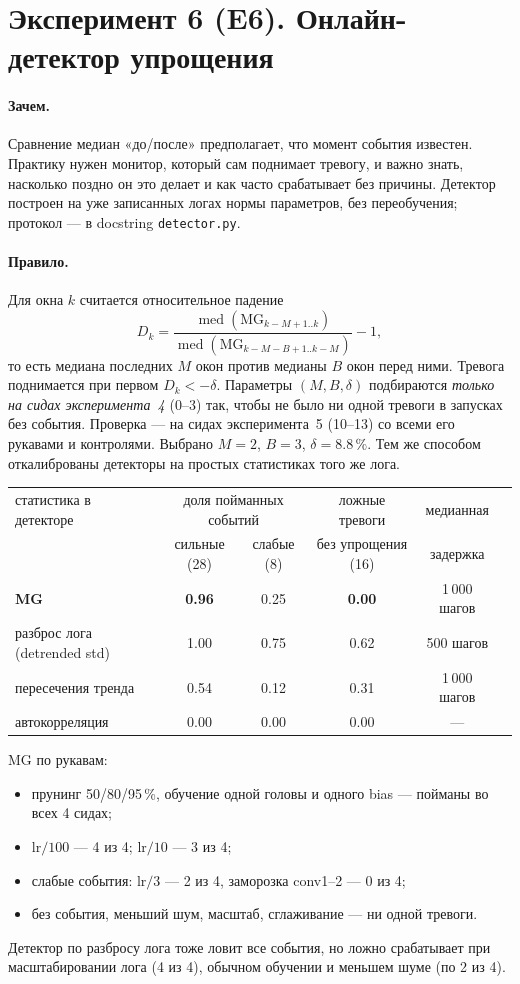 \documentclass[10pt,a4paper]{article}
\newcommand{\mg}{\mathrm{MG}}
\newcommand{\good}[1]{\textcolor[HTML]{117733}{#1}}
\newcommand{\bad}[1]{\textcolor[HTML]{BB5566}{#1}}
\begin{document}
\section{Эксперимент 6 (E6). Онлайн-детектор упрощения}

\paragraph{Зачем.} Сравнение медиан «до/после» предполагает, что момент события
известен. Практику нужен монитор, который сам поднимает тревогу, и важно знать,
насколько поздно он это делает и как часто срабатывает без причины. Детектор
построен на уже записанных логах нормы параметров, без переобучения; протокол ---
в docstring \texttt{detector.py}.

\paragraph{Правило.} Для окна $k$ считается относительное падение
\[
D_k=\frac{\operatorname{med}(\mg_{k-M+1..k})}{\operatorname{med}(\mg_{k-M-B+1..k-M})}-1,
\]
то есть медиана последних $M$ окон против медианы $B$ окон перед ними. Тревога
поднимается при первом $D_k<-\delta$. Параметры $(M,B,\delta)$ подбираются \emph{только
на сидах эксперимента~4} (0--3) так, чтобы не было ни одной тревоги в запусках без
события. Проверка --- на сидах эксперимента~5 (10--13) со всеми его рукавами и
контролями. Выбрано $M=2$, $B=3$, $\delta=8.8\,\%$. Тем же способом откалиброваны
детекторы на простых статистиках того же лога.

\begin{center}\small
\begin{tabular}{lccccc}\toprule
статистика в детекторе & \multicolumn{2}{c}{доля пойманных событий} & ложные тревоги & медианная\\
& сильные (28) & слабые (8) & без упрощения (16) & задержка\\\midrule
\textbf{MG} & \good{\textbf{0.96}} & 0.25 & \good{\textbf{0.00}} & 1\,000 шагов\\
разброс лога (detrended std) & 1.00 & 0.75 & \bad{0.62} & 500 шагов\\
пересечения тренда & 0.54 & 0.12 & \bad{0.31} & 1\,000 шагов\\
автокорреляция & 0.00 & 0.00 & 0.00 & ---\\
\bottomrule\end{tabular}
\end{center}

MG по рукавам:
\begin{itemize}\setlength\itemsep{0pt}
\item прунинг 50/80/95\,\%, обучение одной головы и одного bias --- пойманы во всех
  4 сидах;
\item lr$/100$ --- 4 из 4; lr$/10$ --- 3 из 4;
\item слабые события: lr$/3$ --- 2 из 4, заморозка conv1--2 --- 0 из 4;
\item без события, меньший шум, масштаб, сглаживание --- ни одной тревоги.
\end{itemize}
Детектор по разбросу лога тоже ловит все события, но ложно срабатывает при
масштабировании лога (4 из 4), обычном обучении и меньшем шуме (по 2 из 4).
\end{document}
